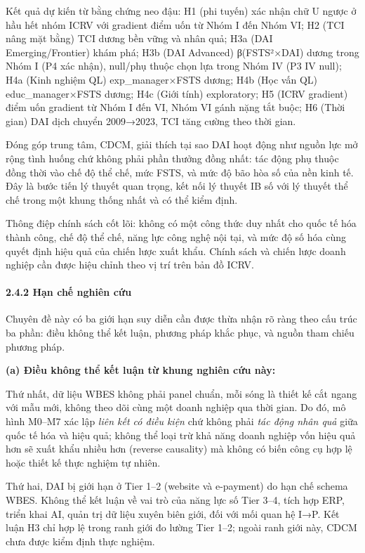 \documentclass[12pt,a4paper]{article}
\begin{document}
Kết quả dự kiến từ bằng chứng neo đậu: H1 (phi tuyến) xác nhận chữ U
ngược ở hầu hết nhóm ICRV với gradient điểm uốn từ Nhóm I đến Nhóm VI;
H2 (TCI nâng mặt bằng) TCI dương bền vững và nhân quả; H3a (DAI
Emerging/Frontier) khám phá; H3b (DAI Advanced) β(FSTS²×DAI) dương trong
Nhóm I (P4 xác nhận), null/phụ thuộc chọn lựa trong Nhóm IV (P3 IV
null); H4a (Kinh nghiệm QL) exp\_manager×FSTS dương; H4b (Học vấn QL)
educ\_manager×FSTS dương; H4c (Giới tính) exploratory; H5 (ICRV
gradient) điểm uốn gradient từ Nhóm I đến VI, Nhóm VI gánh nặng tắt
buộc; H6 (Thời gian) DAI dịch chuyển 2009→2023, TCI tăng cường theo thời
gian.

Đóng góp trung tâm, CDCM, giải thích tại sao DAI hoạt động như nguồn lực
mở rộng tình huống chứ không phải phần thưởng đồng nhất: tác động phụ
thuộc đồng thời vào chế độ thể chế, mức FSTS, và mức độ bão hòa số của
nền kinh tế. Đây là bước tiến lý thuyết quan trọng, kết nối lý thuyết IB
số với lý thuyết thể chế trong một khung thống nhất và có thể kiểm định.

Thông điệp chính sách cốt lõi: không có một công thức duy nhất cho quốc
tế hóa thành công, chế độ thể chế, năng lực công nghệ nội tại, và mức độ
số hóa cùng quyết định hiệu quả của chiến lược xuất khẩu. Chính sách và
chiến lược doanh nghiệp cần được hiệu chỉnh theo vị trí trên bản đồ
ICRV.

\hypertarget{242-hux1ea1n-chux1ebf-nghiuxean-cux1ee9u}{%
\paragraph{2.4.2 Hạn chế nghiên
cứu}\label{242-hux1ea1n-chux1ebf-nghiuxean-cux1ee9u}}

Chuyên đề này có ba giới hạn suy diễn cần được thừa nhận rõ ràng theo
cấu trúc ba phần: điều không thể kết luận, phương pháp khắc phục, và
nguồn tham chiếu phương pháp.

\textbf{(a) Điều không thể kết luận từ khung nghiên cứu này:}

Thứ nhất, dữ liệu WBES không phải panel chuẩn, mỗi sóng là thiết kế cắt
ngang với mẫu mới, không theo dõi cùng một doanh nghiệp qua thời gian.
Do đó, mô hình M0--M7 xác lập \emph{liên kết có điều kiện} chứ không
phải \emph{tác động nhân quả} giữa quốc tế hóa và hiệu quả; không thể
loại trừ khả năng doanh nghiệp vốn hiệu quả hơn sẽ xuất khẩu nhiều hơn
(reverse causality) mà không có biến công cụ hợp lệ hoặc thiết kế thực
nghiệm tự nhiên.

Thứ hai, DAI bị giới hạn ở Tier 1--2 (website và e-payment) do hạn chế
schema WBES. Không thể kết luận về vai trò của năng lực số Tier 3--4,
tích hợp ERP, triển khai AI, quản trị dữ liệu xuyên biên giới, đối với
mối quan hệ I→P. Kết luận H3 chỉ hợp lệ trong ranh giới đo lường Tier
1--2; ngoài ranh giới này, CDCM chưa được kiểm định thực nghiệm.
\end{document}

